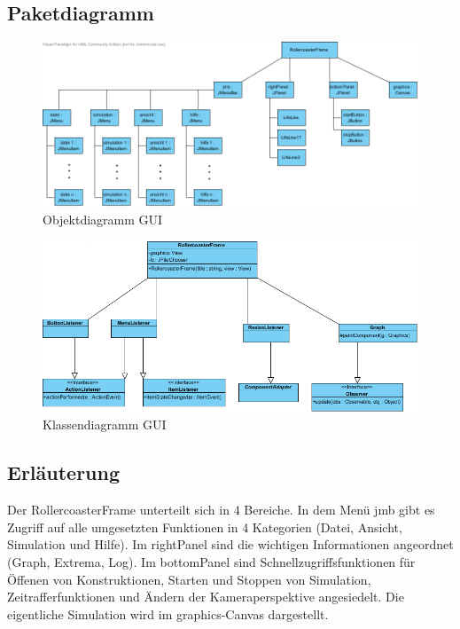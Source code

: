 \subsection{Paketdiagramm}
\begin{figure}
\includegraphics[width=\linewidth]{bilder/GUI_Objektdiagramm}
\caption{Objektdiagramm GUI}
\end{figure}
\begin{figure}
\includegraphics[width=\linewidth]{bilder/GUI_Klassendiagramm}
\caption{Klassendiagramm GUI}
\end{figure}
\subsection{Erläuterung}

Der RollercoasterFrame unterteilt sich in 4 Bereiche. In dem Menü jmb gibt es Zugriff auf alle umgesetzten Funktionen in 4 Kategorien (Datei, Ansicht, Simulation und Hilfe). Im rightPanel sind die wichtigen Informationen angeordnet (Graph, Extrema, Log). Im bottomPanel sind Schnellzugriffsfunktionen für Öffenen von Konstruktionen, Starten und Stoppen von Simulation, Zeitrafferfunktionen und Ändern der Kameraperspektive angesiedelt. Die eigentliche Simulation wird im graphics-Canvas dargestellt.

